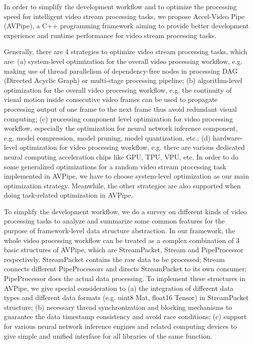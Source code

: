 \begin{bigabstract}
In order to simplify the development workflow and to optimize the processing speed for intelligent video stream processing tasks, we propose Accel-Video Pipe (AVPipe),  a C++ programming framework aiming to provide better development experience and runtime performance for video stream processing tasks.

Generally, there are 4 strategies to optimize video stream processing tasks, which are: (a) system-level optimization for the overall video processing workflow, e.g. making use of thread parallelism of dependency-free nodes in processing DAG (Directed Acyclic Graph) or multi-stage processing pipeline;  (b) algorithm-level optimization for the overall video processing workflow, e.g. the continuity of visual motion inside consecutive video frames can be used to propagate processing output of one frame to the next frame thus avoid redundant visual computing; (c) processing component level optimization for video processing workflow, especially the optimization for neural network inference component, e.g. model compression, model pruning, model quantization, etc.; (d) hardware-level optimization for video processing workflow, e.g. there are various dedicated neural computing acceleration chips like GPU, TPU, VPU, etc. In order to do some generalized optimizations for a random video stream processing task implemented in AVPipe, we have to choose system-level optimization as our main optimization strategy. Meanwhile, the other strategies are also supported when doing task-related optimization in AVPipe.

To simplify the development workflow, we do a survey on different kinds of video processing tasks to analyze and summarize some common features for the purpose of framework-level data structure abstraction. In our framework, the whole video processing workflow can be treated as a complex combination of 3 basic structures of AVPipe, which are StreamPacket, Stream and PipeProcessor respectively. StreamPacket contains the raw data to be processed; Stream connects different PipeProcessors and directs StreamPacket to its own consumer; PipeProcessor does the actual data processing. To implement these structures in AVPipe, we give special consideration to (a) the integration of different data types and different data formats (e.g. uint8 Mat, float16 Tensor) in StreamPacket structure; (b) necessary thread synchronization and blocking mechanisms to guarantee the data timestamp consistency and avoid race conditions; (c) support for various neural network inference engines and related  computing devices to give simple and unified interface for all libraries of the same function. 


\end{bigabstract}
